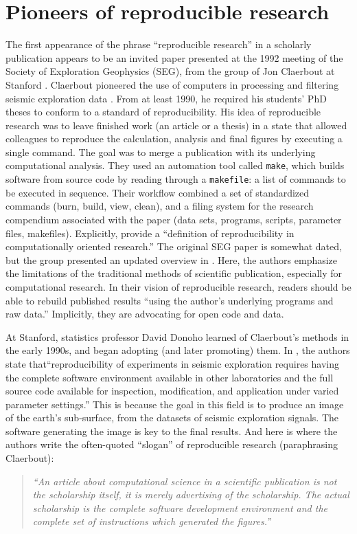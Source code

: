 \documentclass{statement}
\newlength{\up}
\begin{document}
\section*{Pioneers of reproducible research}
\vspace{\up}

The first appearance of the phrase ``reproducible research'' in a scholarly publication appears to be an invited paper presented at the 1992 meeting of the Society of Exploration Geophysics (SEG), from the group of Jon Claerbout at Stanford \cite[]{claerbout1992}.
Claerbout pioneered the use of computers in processing and filtering seismic exploration data \cite[]{wiki:claerbout}.
From at least 1990, he required his students' PhD theses to conform to a standard of reproducibility.
His idea of reproducible research was to leave finished work (an article or a thesis) in a state that allowed colleagues to reproduce the calculation, analysis and final figures by executing a single command.
The goal was to merge a publication with its underlying computational analysis.
They used an automation tool called \texttt{make}, which builds software from source code by reading through a \texttt{makefile}: a list of commands to be executed in sequence.
Their workflow combined a set of standardized commands (burn, build, view, clean), and a filing system for the research compendium associated with the paper (data sets, programs, scripts, parameter files, makefiles).
Explicitly, \cite{claerbout1992} provide a ``definition of reproducibility in computationally oriented research.''
The original SEG paper is somewhat dated, but the group presented an updated overview in \cite{schwabETal2000}.
Here, the authors emphasize the limitations of the traditional methods of scientific publication, especially for computational research. 
In their vision of reproducible research, readers should be able to rebuild published results ``using the author's underlying programs and raw data.''
Implicitly, they are advocating for open code and data.

At Stanford, statistics professor David Donoho learned of Claerbout's methods in the early 1990s, and began adopting (and later promoting) them. 
In \cite{buckheit_donoho1995}, the authors state that``reproducibility of experiments in seismic exploration requires having the complete software environment available in other laboratories and the full source code available for inspection, modification, and application under varied parameter settings.'' 
This is because the goal in this field is to produce an image of the earth's sub-surface, from the datasets of seismic exploration signals. The software generating the image is key to the final results. 
And here is where the authors write the often-quoted ``slogan'' of reproducible research (paraphrasing Claerbout): 
\begin{quote}
\emph{``An article about computational science in a scientific publication is not the scholarship itself, it is merely advertising of the scholarship. The actual scholarship is the complete software development environment and the complete set of instructions which generated the figures.''}
\end{quote}
\end{document}
